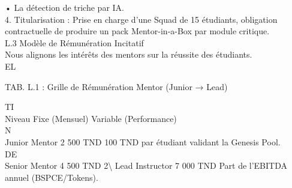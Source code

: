\documentclass[12pt,landscape,a4paper]{article}
\begin{document}
• La détection de triche par IA.\\
\vspace{0.5em}
4. Titularisation : Prise en charge d’une Squad de 15 étudiants, obligation contractuelle de produire un pack Mentor-in-a-Box par module critique.\\
\vspace{0.5em}
\vspace{0.5em}
\vspace{0.5em}
L.3 Modèle de Rémunération Incitatif\\
Nous alignons les intérêts des mentors sur la réussite des étudiants.\\
\vspace{0.5em}
\vspace{0.5em}
\vspace{0.5em}
\vspace{0.5em}
EL\\
\begin{center}\begin{tabular}TAB. L.1 : Grille de Rémunération Mentor (Junior → Lead)\end{tabular}\end{center}
\vspace{0.5em}
\vspace{0.5em}
\vspace{0.5em}
\vspace{0.5em}
TI\\
Niveau          Fixe (Mensuel) Variable (Performance)\\
\vspace{0.5em}
\vspace{0.5em}
\vspace{0.5em}
\vspace{0.5em}
N\\
Junior Mentor 2 500 TND        100 TND par étudiant validant la Genesis Pool.\\
\vspace{0.5em}
\vspace{0.5em}
\vspace{0.5em}
\vspace{0.5em}
DE\\
Senior Mentor 4 500 TND        2\textbackslash{}%
Lead Instructor 7 000 TND      Part de l’EBITDA annuel (BSPCE/Tokens).\\
\vspace{0.5em}
\vspace{0.5em}
\end{document}
